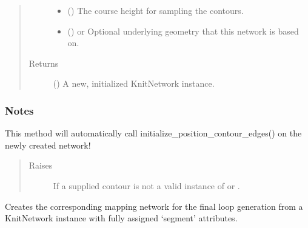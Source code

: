 \documentclass[letterpaper,10pt,english]{sphinxmanual}
\begin{document}
\begin{fulllineitems}
\begin{fulllineitems}
\begin{quote}
\begin{description}
\begin{itemize}
\item {} 
 () \textendash{} The course height for sampling the contours.

\item {} 
 () \textendash{} or 
Optional underlying geometry that this network is based on.

\end{itemize}

\item[{Returns}] \leavevmode
{} () \textendash{} A new, initialized KnitNetwork instance.

\end{description}\end{quote}
\subsubsection*{Notes}

This method will automatically call initialize\_position\_contour\_edges()
on the newly created network!
\begin{quote}\begin{description}
\item[{Raises}] \leavevmode
{\hyperref[\detokenize{cockatoo:cockatoo.exception.KnitNetworkGeometryError}]{}} \textendash{} If a supplied contour is not a valid instance of
     or .

\end{description}\end{quote}

\end{fulllineitems}


\begin{fulllineitems}
\label{\detokenize{cockatoo:cockatoo.KnitNetwork.create_mapping_network}}
Creates the corresponding mapping network for the final loop generation
from a KnitNetwork instance with fully assigned ‘segment’ attributes.


\end{fulllineitems}
\end{fulllineitems}
\end{document}
